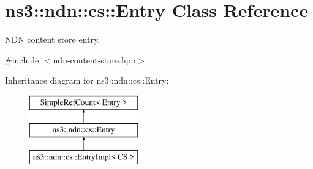 \hypertarget{classns3_1_1ndn_1_1cs_1_1Entry}{}\section{ns3\+:\+:ndn\+:\+:cs\+:\+:Entry Class Reference}
\label{classns3_1_1ndn_1_1cs_1_1Entry}


N\+DN content store entry.  




{\ttfamily \#include $<$ndn-\/content-\/store.\+hpp$>$}

Inheritance diagram for ns3\+:\+:ndn\+:\+:cs\+:\+:Entry\+:\begin{figure}[H]
\begin{center}
\leavevmode
\includegraphics[height=3.000000cm]{classns3_1_1ndn_1_1cs_1_1Entry}
\end{center}
\end{figure}
